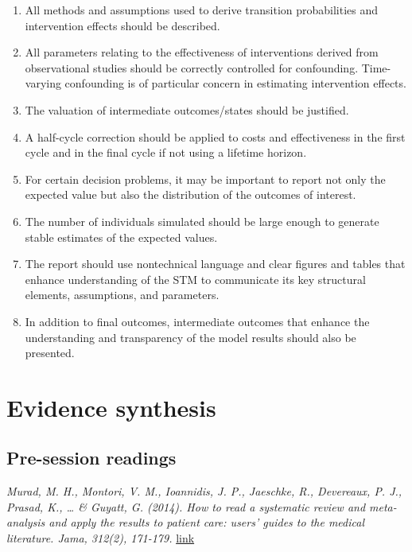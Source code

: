 \documentclass[
]{book}
\begin{document}
\begin{enumerate}
\item
  All methods and assumptions used to derive transition probabilities and intervention effects should be described.
\item
  All parameters relating to the effectiveness of interventions derived from observational studies should be correctly controlled for confounding. Time-varying confounding is of particular concern in estimating intervention effects.
\item
  The valuation of intermediate outcomes/states should be justified.
\item
  A half-cycle correction should be applied to costs and effectiveness in the first cycle and in the final cycle if not using a lifetime horizon.
\item
  For certain decision problems, it may be important to report not only the expected value but also the distribution of the outcomes of interest.
\item
  The number of individuals simulated should be large enough to generate stable estimates of the expected values.
\item
  The report should use nontechnical language and clear figures and tables that enhance understanding of the STM to communicate its key structural elements, assumptions, and parameters.
\item
  In addition to final outcomes, intermediate outcomes that enhance the understanding and transparency of the model results should also be presented.
\end{enumerate}

\hypertarget{evidence}{%
\chapter{Evidence synthesis}\label{evidence}}

\hypertarget{pre-session-readings-4}{%
\section{Pre-session readings}\label{pre-session-readings-4}}

\emph{Murad, M. H., Montori, V. M., Ioannidis, J. P., Jaeschke, R., Devereaux, P. J., Prasad, K., \ldots{} \& Guyatt, G. (2014). How to read a systematic review and meta-analysis and apply the results to patient care: users' guides to the medical literature. Jama, 312(2), 171-179.} \href{https://https://jamanetwork.com/journals/jama/article-abstract/1886196}{link}
\end{document}
